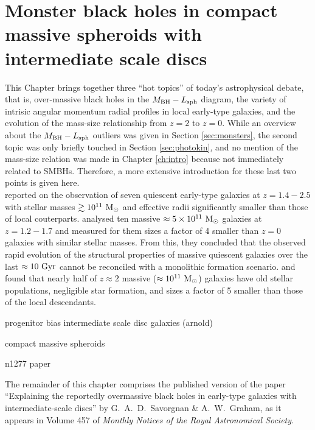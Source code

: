 \chapter{Monster black holes in compact massive spheroids with intermediate scale discs}
\label{ch:ellic}

This Chapter brings together three ``hot topics'' of today's astrophysical debate, 
that is, over-massive black holes in the $M_{\rm BH} - L_{\rm sph}$ diagram, 
the variety of intrisic angular momentum radial profiles in local early-type galaxies, 
and the evolution of the mass-size relationship from $z=2$ to $z=0$. 
While an overview about the $M_{\rm BH} - L_{\rm sph}$ outliers was given in Section \ref{sec:monsters}, 
the second topic was only briefly touched in Section \ref{sec:photokin}, 
and no mention of the mass-size relation was made in Chapter \ref{ch:intro} 
because not immediately related to SMBHs. 
Therefore, a more extensive introduction for these last two points is given here. \\ 

\citet{daddi2005} reported on the observation of seven quiescent early-type galaxies 
at $z=1.4-2.5$ with stellar masses $\gtrsim 10^{11} \rm~M_\odot$ 
and effective radii significantly smaller than those of local couterparts. 
\citet{trujillo2006} analysed ten massive $\approx 5 \times 10^{11} \rm~M_\odot$ galaxies at $z=1.2-1.7$ 
and measured for them sizes a factor of 4 smaller than $z=0$ galaxies with similar stellar masses. 
From this, they concluded that the observed rapid evolution of the structural properties of massive quiescent galaxies 
over the last $\approx 10 \rm~Gyr$ 
cannot be reconciled with a monolithic formation scenario. 
\citet{kriek2008} and \citet{vandokkum2008} found that nearly half of $z \approx 2$ 
massive ($\approx 10^{11} \rm~M_\odot$) galaxies 
have old stellar populations, negligible star formation, and sizes a factor of 5 smaller than 
those of the local descendants. 
 
progenitor bias
intermediate scale disc galaxies (arnold)

compact massive spheroids

n1277 paper


The remainder of this chapter comprises the published version of the paper 
``Explaining the reportedly overmassive black holes in early-type galaxies with intermediate-scale discs'' 
by G.~A.~D.~Savorgnan \& A.~W.~Graham,  
as it appears in Volume 457 of \emph{Monthly Notices of the Royal Astronomical Society}. 


